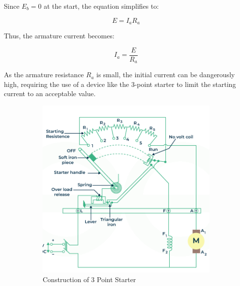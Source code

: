 \documentclass[a4paper,12pt]{article}
\begin{document}
	Since \(E_b = 0\) at the start, the equation simplifies to:
	
	\[
	E = I_a R_a
	\]
	
	Thus, the armature current becomes:
	
	\[
	I_a = \frac{E}{R_a}
	\]
	
	As the armature resistance \(R_a\) is small, the initial current can be dangerously high, requiring the use of a device like the 3-point starter to limit the starting current to an acceptable value.
	
	
	
\begin{figure}[H]
	\centering

	\label{fig:construction-of-3-point-starter}
\end{figure}
	\begin{figure}[H]
		\centering
		\begin{subfigure}[t]{0.49\textwidth}
			\centering
			\includegraphics[width=1.2\linewidth]{Images/Construction-of-3-Point-Starter}
		\caption{Construction of 3 Point Starter}
		\end{subfigure}
		\hfill
		\begin{subfigure}[t]{0.48\textwidth}
			\centering

\end{subfigure}
\end{figure}
\end{document}
